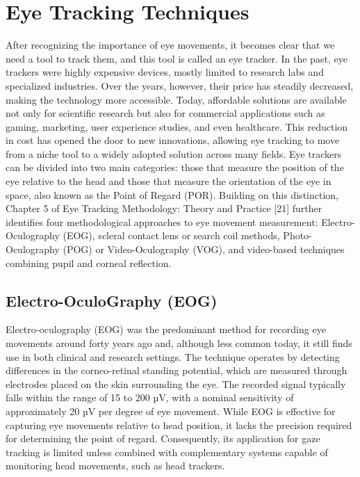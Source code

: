 \documentclass[12pt]{report}
\begin{document}
\section{Eye Tracking Techniques}

After recognizing the importance of eye movements, it becomes clear that we need a tool to track them, and this tool is called an eye tracker.
In the past, eye trackers were highly expensive devices, mostly limited to research labs and specialized industries.
Over the years, however, their price has steadily decreased, making the technology more accessible.
Today, affordable solutions are available not only for scientific research but also for commercial applications such as gaming, marketing, user experience studies, and even healthcare.
This reduction in cost has opened the door to new innovations, allowing eye tracking to move from a niche tool to a widely adopted solution across many fields.
Eye trackers can be divided into two main categories: those that measure the position of the eye relative to the head and those that measure the orientation of the eye in space, also known as the Point of Regard (POR).
Building on this distinction, Chapter 5 of Eye Tracking Methodology: Theory and Practice [21] further identifies four methodological approaches to eye movement measurement: Electro-Oculography (EOG), scleral contact lens or search coil methods, Photo-Oculography (POG) or Video-Oculography (VOG), and video-based techniques combining pupil and corneal reflection.

\subsection{Electro-OculoGraphy (EOG)}

Electro-oculography (EOG) was the predominant method for recording eye movements around forty years ago and, although less common today, it still finds use in both clinical and research settings.
The technique operates by detecting differences in the corneo-retinal standing potential, which are measured through electrodes placed on the skin surrounding the eye. The recorded signal typically falls within the range of 15 to 200 µV, with a nominal sensitivity of approximately 20 µV per degree of eye movement. While EOG is effective for capturing eye movements relative to head position, it lacks the precision required for determining the point of regard. Consequently, its application for gaze tracking is limited unless combined with complementary systems capable of monitoring head movements, such as head trackers.
\end{document}

